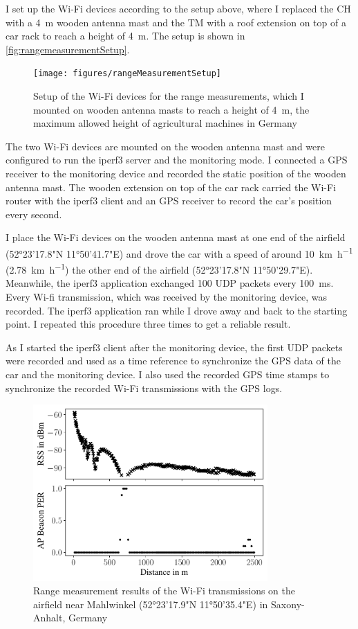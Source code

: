 I set up the Wi-Fi devices according to the setup above, where I replaced the \ac{CH} with a \SI{4}{\metre} wooden antenna mast and
the \ac{TM} with a roof extension on top of a car rack to reach a height of \SI{4}{\metre}.
The setup is shown in \autoref{fig:rangemeasurementSetup}.
\begin{figure}[]%
   \centering
   \texttt{[image: figures/rangeMeasurementSetup]}
   \caption{Setup of the Wi-Fi devices for the range measurements, which I mounted on wooden antenna masts to reach a height of \SI{4}{\metre}, the
   maximum allowed height of agricultural machines in Germany}
   \label{fig:rangemeasurementSetup}%
\end{figure}

The two Wi-Fi devices are mounted on the wooden antenna mast and were configured to run the iperf3 server and the monitoring mode.
I connected a \ac{GPS} receiver to the monitoring device and recorded the static position of the wooden antenna mast.
The wooden extension on top of the car rack carried the Wi-Fi router with the iperf3 client and an \ac{GPS} receiver to record the car's position every
second.

I place the Wi-Fi devices on the wooden antenna mast at one end of the airfield (52°23'17.8"N 11°50'41.7"E)
and drove the car with a speed of around \SI{10}{\kilo\metre\per\hour} (\SI{2.78}{\kilo\metre\per\hour}) the other end
of the airfield (52°23'17.8"N 11°50'29.7"E). Meanwhile, the iperf3 application exchanged \SI{100}{\byte} \ac{UDP} packets every
\SI{100}{\milli\second}.
Every Wi-fi transmission, which was received by the monitoring device, was recorded.
The iperf3 application ran while I drove away and back to the starting point.
I repeated this procedure three times to get a reliable result.

As I started the iperf3 client after the monitoring device, the first \ac{UDP} packets were recorded and used as a time reference to
synchronize the \ac{GPS} data of the car and the monitoring device.
I also used the recorded GPS time stamps to synchronize the recorded Wi-Fi transmissions with the \ac{GPS} logs.

\begin{figure}[]%
   \centering
   \includegraphics[width=0.8\textwidth]{figures/rangeMeasurementResults2}
   \caption{Range measurement results of the Wi-Fi transmissions on the airfield near Mahlwinkel (52°23'17.9"N 11°50'35.4"E) in Saxony-Anhalt, Germany}
   \label{fig:rangemeasurementResults}%
\end{figure}

